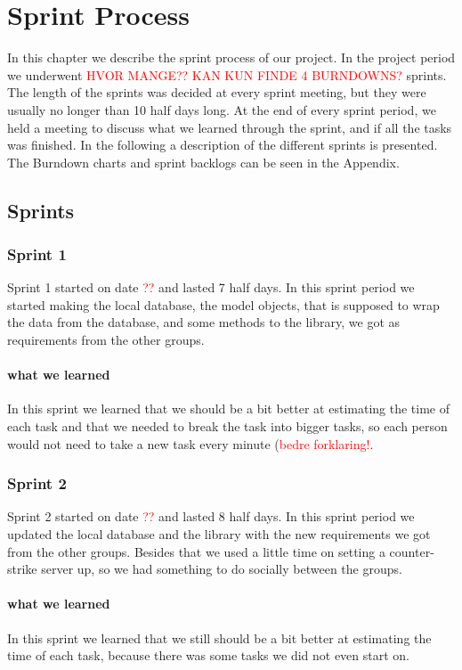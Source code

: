 \chapter{Sprint Process}
\label{ch:SprintProcess}
In this chapter we describe the sprint process of our project. In the project period we underwent \textcolor{red}{HVOR MANGE?? KAN KUN FINDE 4 BURNDOWNS?} sprints. The length of the sprints was decided at every sprint meeting, but they were usually no longer than 10 half days long. At the end of every sprint period, we held a meeting to discuss what we learned through the sprint, and if all the tasks was finished. In the following a description of the different sprints is presented. The Burndown charts and sprint backlogs can be seen in the Appendix.

\section{Sprints}
\subsection{Sprint 1}
Sprint 1 started on date \textcolor{red}{??} and lasted 7 half days. In this sprint period we started making the local database, the model objects, that is supposed to wrap the data from the database, and some methods to the library, we got as requirements from the other groups.

\subsubsection{what we learned}
In this sprint we learned that we should be a bit better at estimating the time of each task and that we needed to break the task into bigger tasks, so each person would not need to take a new task every minute (\textcolor{red}{bedre forklaring!}.

\subsection{Sprint 2}
Sprint 2 started on date \textcolor{red}{??} and lasted 8 half days. In this sprint period we updated the local database and the library with the new requirements we got from the other groups. Besides that we used a little time on setting a counter-strike server up, so we had something to do socially between the groups.

\subsubsection{what we learned}
In this sprint we learned that we still should be a bit better at estimating the time of each task, because there was some tasks we did not even start on.

